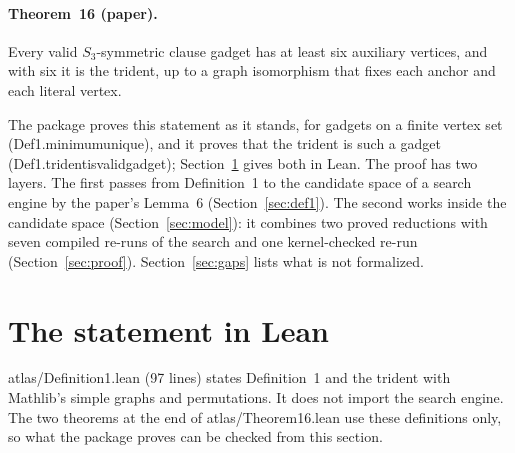 \documentclass[11pt,a4paper]{article}
\newcommand{\leanus}{\textunderscore\allowbreak}
\newcommand{\lean}[1]{{\ttfamily\let\_\leanus #1}}
\theoremstyle{definition}
\begin{document}
\paragraph{Theorem~16 (paper).} Every valid $S_3$-symmetric clause gadget has
at least six auxiliary vertices, and with six it is the trident, up to a graph
isomorphism that fixes each anchor and each literal vertex.

\medskip
The package proves this statement as it stands, for gadgets on a finite
vertex set (\lean{Def1.minimum\_unique}), and it proves that the trident is
such a gadget (\lean{Def1.trident\_is\_valid\_gadget}); Section~\ref{sec:statement}
gives both in Lean. The proof has two layers. The first passes from
Definition~1 to the candidate space of a search engine by the paper's Lemma~6
(Section~\ref{sec:def1}). The second works inside the candidate space
(Section~\ref{sec:model}): it combines two proved reductions with seven
compiled re-runs of the search and one kernel-checked re-run
(Section~\ref{sec:proof}). Section~\ref{sec:gaps} lists what is not
formalized.

\section{The statement in Lean}\label{sec:statement}

\lean{atlas/Definition1.lean} (97 lines) states Definition~1 and the trident
with Mathlib's simple graphs and permutations. It does not import the search
engine. The two theorems at the end of \lean{atlas/Theorem16.lean} use these
definitions only, so what the package proves can be checked from this
section.
\end{document}
